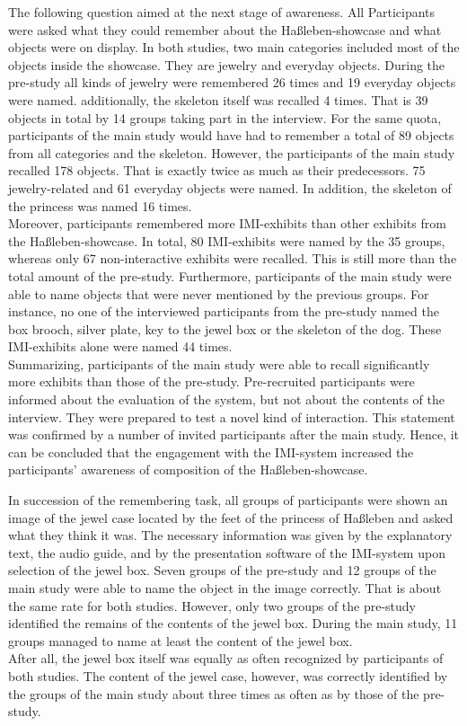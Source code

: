 The following question aimed at the next stage of awareness. All Participants were asked what they could remember about the Haßleben-showcase and what objects were on display. In both studies, two main categories included most of the objects inside the showcase. They are jewelry and everyday objects. During the pre-study all kinds of jewelry were remembered 26 times and 19 everyday objects were named. additionally, the skeleton itself was recalled 4 times. That is 39 objects in total by 14 groups taking part in the interview. For the same quota, participants of the main study would have had to remember a total of 89 objects from all categories and the skeleton. However, the participants of the main study recalled 178 objects. That is exactly twice as much as their predecessors. 75 jewelry-related and 61 everyday objects were named. In addition, the skeleton of the princess was named 16 times.
\\
Moreover, participants remembered more \ac{IMI}-exhibits than other exhibits from the Haßleben-showcase. In total, 80 \ac{IMI}-exhibits were named by the 35 groups, whereas only 67 non-interactive exhibits were recalled. This is still more than the total amount of the pre-study. Furthermore, participants of the main study were able to name objects that were never mentioned by the previous groups. For instance, no one of the interviewed participants from the pre-study named the box brooch, silver plate, key to the jewel box or the skeleton of the dog. These \ac{IMI}-exhibits alone were named 44 times.
\\
Summarizing, participants of the main study were able to recall significantly more exhibits than those of the pre-study. Pre-recruited participants were informed about the evaluation of the system, but not about the contents of the interview. They were prepared to test a novel kind of interaction. This statement was confirmed by a number of invited participants after the main study. Hence, it can be concluded that the engagement with the \ac{IMI}-system increased the participants' awareness of composition of the Haßleben-showcase.

In succession of the remembering task, all groups of participants were shown an image of the jewel case located by the feet of the princess of Haßleben and asked what they think it was. The necessary information was given by the explanatory text, the audio guide, and by the presentation software of the \ac{IMI}-system upon selection of the jewel box. Seven groups of the pre-study and 12 groups of the main study were able to name the object in the image correctly. That is about the same rate for both studies. However, only two groups of the pre-study identified the remains of the contents of the jewel box. During the main study, 11 groups managed to name at least the content of the jewel box.
\\
After all, the jewel box itself was equally as often recognized by participants of both studies. The content of the jewel case, however, was correctly identified by the groups of the main study about three times as often as by those of the pre-study. 

